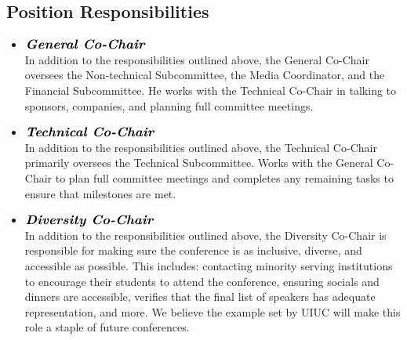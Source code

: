 




\subsection{Position Responsibilities}

\begin{itemize}
	\item $\large\textbf{\textit{General Co-Chair}}$\\
	In addition to the responsibilities outlined above, the General Co-Chair oversees the
	Non-technical Subcommittee, the Media Coordinator, and the Financial Subcommittee. He works with the Technical Co-Chair in talking to sponsors, companies, and planning full committee meetings. 
	\item $\large\textbf{\textit{Technical Co-Chair}}$\\
	In addition to the responsibilities outlined above, the Technical Co-Chair primarily oversees the
	Technical Subcommittee. Works with the General Co-Chair to plan full committee meetings and completes any remaining tasks to ensure that milestones are met.
	\item $\large\textbf{\textit{Diversity Co-Chair}}$\\
	In addition to the responsibilities outlined above, the Diversity Co-Chair is responsible for making sure the conference is as inclusive, diverse, and accessible as possible. This includes: contacting minority serving institutions to encourage their students to attend the conference, ensuring socials and dinners are accessible, verifies that the final list of speakers has adequate representation, and more. We believe the example set by UIUC will make this role a staple of future conferences.


\end{itemize}
